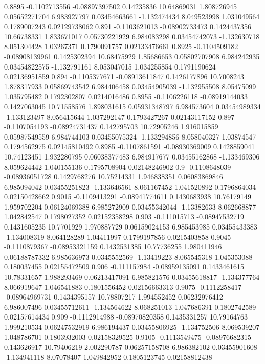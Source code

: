 {0.8895 -0.1102713556 -0.08897397502 0.14235836 10.64869031 1.808726945 0.05652271704 6.983927797 0.03454663661 -1.132474434 8.049523998 1.031049564 0.1789007243 0.02129738062
0.891 -0.1103621013 -0.08902733473 0.1424437356 10.66738331 1.833671017 0.05730221929 6.984083298 0.03454742073 -1.132630718 8.051304428 1.03267371 0.1790091757 0.02133476661
0.8925 -0.1104509182 -0.08908139961 0.1425302394 10.68475929 1.85686653 0.05802707908 6.984242935 0.03454822575 -1.132791161 8.053047015 1.034255854 0.1791190624 0.02136951859
0.894 -0.1105377671 -0.08913611847 0.1426177896 10.7008243 1.878317933 0.05869743542 6.984406458 0.03454905039 -1.132955508 8.05475099 1.035795482 0.1792302807 0.0214016486
0.8955 -0.1106226118 -0.08919144033 0.1427063045 10.71558576 1.898031615 0.05931348797 6.984573604 0.03454989334 -1.133123497 8.056415644 1.037292147 0.1793427267 0.02143117152
0.897 -0.1107054193 -0.08924731437 0.142795703 10.72905246 1.916015859 0.05987549559 6.984744103 0.03455075324 -1.133294856 8.058040327 1.03874547 0.1794562975 0.02145810492
0.8985 -0.1107861591 -0.08930369009 0.1428859041 10.74123451 1.932280795 0.06038377483 6.984917677 0.03455162868 -1.133469306 8.059624442 1.040155136 0.1795708904 0.02148246902
0.9 -0.1108648039 -0.08936051728 0.1429768276 10.75214331 1.946838351 0.06083869846 6.985094042 0.03455251823 -1.133646561 8.061167452 1.041520892 0.1796864034 0.02150428662
0.9015 -0.1109413291 -0.08941774611 0.1430683938 10.76179149 1.959702204 0.06124069388 6.985272909 0.03455342044 -1.13382633 8.062668877 1.042842547 0.1798027352 0.02152358298
0.903 -0.111015713 -0.08947532719 0.1431605235 10.7701929 1.970887729 0.06159024153 6.985453985 0.03455433383 -1.134008319 8.064128289 1.04411997 0.1799197856 0.0215403858
0.9045 -0.1110879367 -0.08953321159 0.1432531385 10.77736255 1.980411946 0.06188787332 6.985636973 0.0345552569 -1.13419223 8.065545318 1.045353088 0.180037455 0.02155472509
0.906 -0.111157984 -0.08959135091 0.1433461615 10.78331657 1.988293469 0.06213417091 6.985821576 0.03455618817 -1.134377764 8.066919647 1.046541883 0.1801556452 0.02156663313
0.9075 -0.1112258417 -0.08964969731 0.1434395157 10.78807217 1.994552452 0.06232976412 6.986007496 0.03455712611 -1.134564622 8.068251013 1.047686391 0.1802742589 0.02157614434
0.909 -0.1112914988 -0.08970820358 0.1435331257 10.79164763 1.999210534 0.06247532919 6.986194437 0.03455806925 -1.134752506 8.069539207 1.048786701 0.1803932003 0.02158329525
0.9105 -0.1113549475 -0.08976682315 0.143626917 10.79406219 2.002290787 0.06257158708 6.986382102 0.03455901608 -1.134941118 8.07078407 1.049842952 0.1805123745 0.02158812438
}
